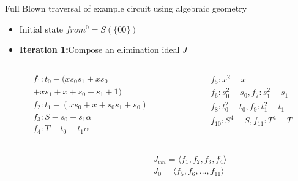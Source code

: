 \documentclass[xcolor=dvipsnames]{beamer}
\newcommand{\bi}{\begin{itemize}}
\newcommand{\ei}{\end{itemize}}
\begin{document}
\begin{frame}{\large{Full Blown traversal of example circuit using algebraic geometry}}
\bi
\item Initial state $from^0 = S(\{00\})$
\item {\bf Iteration 1:}Compose an elimination ideal $J$ 
\ei
\vspace{-0.2in}
\begin{columns}[onlytextwidth]
\begin{column}{0.5\textwidth}
\begin{align*}
&f_1: t_0- (xs_0s_1+xs_0\\
&+xs_1+x+s_0+s_1+1)\\
&f_2: t_1 - (xs_0+x+s_0s_1+s_0)\\
&f_3: S - s_0 - s_1\alpha\\
&f_4: T - t_0 - t_1\alpha
\end{align*}
\end{column}
\vspace{-0.2in}
\begin{column}{0.5\textwidth}
\begin{align*}
&f_5: x^2-x\\
&f_6: s_0^2-s_0, f_7: s_1^2-s_1\\
&f_8: t_0^2-t_0, f_9: t_1^2-t_1\\
&f_{10}: S^4-S, f_{11}:T^4-T
\end{align*}
\end{column}
\end{columns}
\begin{columns}[onlytextwidth]
\begin{column}{0.7\textwidth}
\begin{figure}[H]
\end{figure}
\end{column}
\begin{column}{0.3\textwidth}
$J_{ckt} = \langle f_1,f_2,f_3,f_4\rangle$\\
$J_0 = \langle f_5,f_6,\dots,f_{11}\rangle$
\end{column}
\end{columns}
\end{frame}
\end{document}
